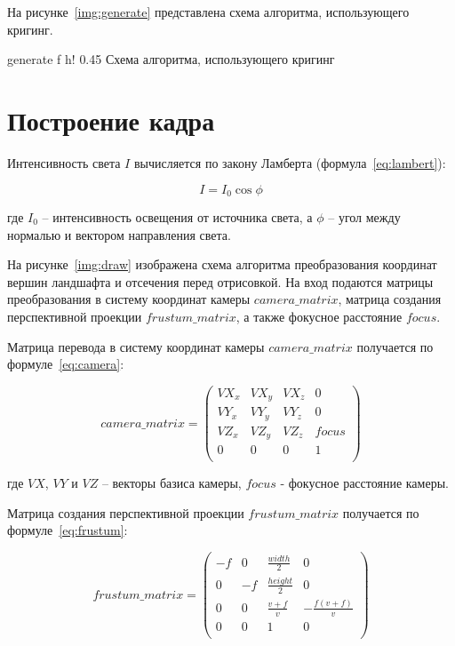 На рисунке~\ref{img:generate} представлена схема алгоритма, использующего кригинг.

\FloatBarrier
{}
{generate} %
{f} %
{h!} %
{0.45\textwidth} %
{Схема алгоритма, использующего кригинг} %
\FloatBarrier
 
\section{Построение кадра}

Интенсивность света $I$ вычисляется по закону Ламберта (формула~\ref{eq:lambert}):

\begin{equation}
	\label{eq:lambert}
	I = I_0 \cos{\phi}
\end{equation}

\noindent где $I_0$ -- интенсивность освещения от источника света, а $\phi$ -- угол между нормалью и вектором направления света.

На рисунке~\ref{img:draw} изображена схема алгоритма преобразования координат вершин ландшафта и отсечения перед отрисовкой. На вход подаются матрицы преобразования в систему координат камеры $camera\_matrix$, матрица создания перспективной проекции $frustum\_matrix$, а также фокусное расстояние $focus$.

Матрица перевода в систему координат камеры $camera\_matrix$ получается по формуле~\ref{eq:camera}:

\begin{equation}
	\label{eq:camera}
	camera\_matrix = \begin{pmatrix}
		VX_x & VX_y & VX_z & 0     \\
		VY_x & VY_y & VY_z & 0     \\
		VZ_x & VZ_y & VZ_z & focus \\
		0    & 0    & 0    & 1     \\
	\end{pmatrix}
\end{equation}

\noindent где $VX$, $VY$ и $VZ$ -- векторы базиса камеры, $focus$ - фокусное расстояние камеры.

Матрица создания перспективной проекции $frustum\_matrix$ получается по формуле~\ref{eq:frustum}:

\begin{equation}
	\label{eq:frustum}
	frustum\_matrix = \begin{pmatrix}
		-f & 0      & \frac{width}{2}  & 0     \\
		0      & -f & \frac{height}{2} & 0     \\
		0      & 0      & \frac{v + f}{v} & - \frac{f(v + f)}{v}\\
		0      & 0      & 1                & 0     \\
	\end{pmatrix}
\end{equation}

